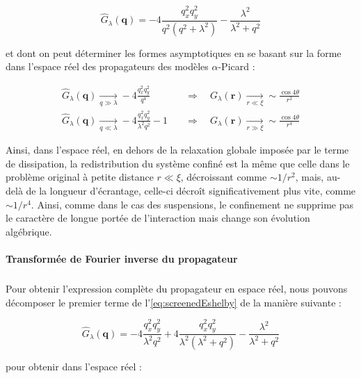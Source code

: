 \begin{equation}
    \hat{G}_\lambda(\mathbf{q}) = -4\frac{q_x^2q_y^2}{q^2(q^2+\lambda^2)}-\frac{\lambda^2}{\lambda^2+q^2}
    \label{eq:screenedEshelby}
\end{equation}

\noindent et dont on peut déterminer les formes asymptotiques en se basant sur la forme dans l'espace réel des propagateurs des modèles $\alpha$-Picard :

\begin{equation}
\begin{aligned}
    \hat{G}_\lambda(\mathbf{q})\xrightarrow[q\gg \lambda]{}-4\frac{q_x^2q_y^2}{q^4} \quad &\Rightarrow \quad G_\lambda(\mathbf{r})\xrightarrow[r\ll \xi]{}\sim\frac{\cos 4\theta}{r^2}\\
    \hat{G}_\lambda(\mathbf{q})\xrightarrow[q \ll \lambda]{}-4\frac{q_x^2q_y^2}{\lambda^2 q^2}-1 \quad &\Rightarrow \quad G_\lambda(\mathbf{r})\xrightarrow[r \gg \xi]{}\sim\frac{\cos 4\theta}{r^4}
\end{aligned}
\label{eq:LPicardAsymp}
\end{equation}

\noindent Ainsi, dans l'espace réel, en dehors de la relaxation globale imposée par le terme de dissipation, la redistribution du système confiné est la même que celle dans le problème original à petite distance $r\ll \xi$, décroissant comme $\sim 1/r^2$, mais, au-delà de la longueur d'écrantage, celle-ci décroît significativement plus vite, comme $\sim 1/r^4$. Ainsi, comme dans le cas des suspensions, le confinement ne supprime pas le caractère de longue portée de l'interaction mais change son évolution algébrique.

\paragraph{Transformée de Fourier inverse du propagateur}

\subparagraph{}Pour obtenir l'expression complète du propagateur en espace réel, nous pouvons décomposer le premier terme de l'\autoref{eq:screenedEshelby} de la manière suivante :

\begin{equation}
    \hat{G}_\lambda(\mathbf{q}) = -4\frac{q_x^2q_y^2}{\lambda^2 q^2} + 4\frac{q_x^2q_y^2}{\lambda^2 (\lambda^2 + q^2)}-\frac{\lambda^2}{\lambda^2+q^2}
\end{equation}

\noindent pour obtenir dans l'espace réel :

